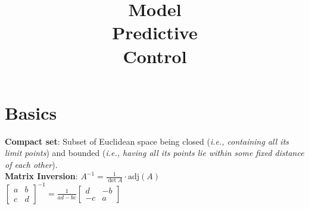 \documentclass[english]{latex4ei/latex4ei_sheet}
\title{Model\\Predictive\\Control}
\begin{document}
\maketitle	%

\section{Basics}
\begin{sectionbox}
\textbf{Compact set}: Subset of Euclidean space being closed (\textit{i.e., containing all its limit points}) and bounded (\textit{i.e., having all its points lie within some fixed distance of each other}).\\
\textbf{Matrix Inversion}: $A^{-1}=\frac{1}{\det{A}}\cdot\textrm{adj}(A)$
\\ $\begin{bmatrix}a & b \\ c & d\end{bmatrix}^{-1} = \frac{1}{ad-bc} \begin{bmatrix}d & -b \\ -c & a\end{bmatrix}$

\end{sectionbox}
\end{document}
